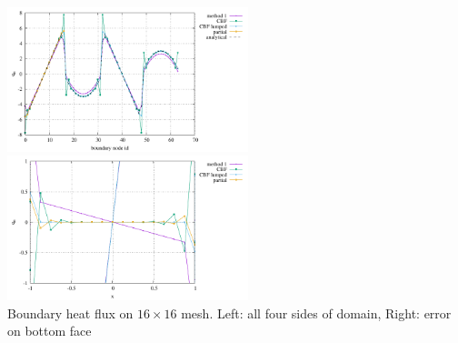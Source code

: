 \begin{center}
\includegraphics[width=7cm]{python_codes/fieldstone_173/results/exp5/heat_flux_boundary.pdf}
\includegraphics[width=7cm]{python_codes/fieldstone_173/results/exp5/heat_flux_boundary_bottom.pdf}\\
{\captionfont Boundary heat flux on $16 \times 16$ mesh. Left: all four 
sides of domain, Right: error on bottom face}
\end{center}




